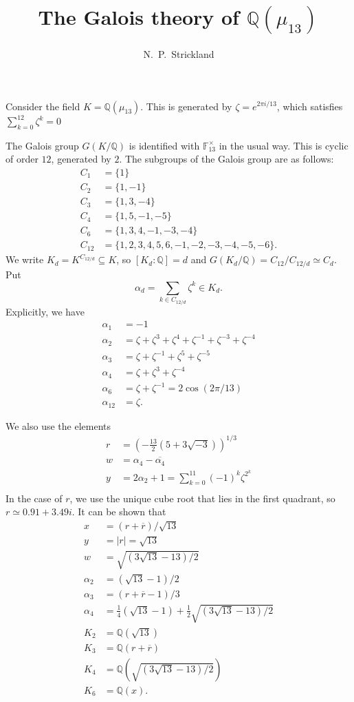 \documentclass{amsart}
\newcommand{\F}         {{\mathbb{F}}}
\newcommand{\Q}         {{\mathbb{Q}}}
\newcommand{\al}        {\alpha}
\newcommand{\ov}[1]     {\overline{#1}}
\newcommand{\sse}       {\subseteq}
\newcommand{\tm}        {\times}
\newcommand{\zt}        {\zeta}
\renewcommand{\:}{\colon}
\theoremstyle{definition}
\begin{document}
\title{The Galois theory of $\Q(\mu_{13})$}
\author{N.~P.~Strickland}

\maketitle 

Consider the field $K=\Q(\mu_{13})$.  This is generated by
$\zt=e^{2\pi i/13}$, which satisfies $\sum_{k=0}^{12}\zt^k=0$

The Galois group $G(K/\Q)$ is identified with $\F_{13}^\tm$ in the
usual way.  This is cyclic of order $12$, generated by $2$.  The
subgroups of the Galois group are as follows:
\begin{align*}
 C_1    &= \{1\} \\
 C_2    &= \{1,-1\} \\
 C_3    &= \{1,3,-4\} \\
 C_4    &= \{1,5,-1,-5\} \\
 C_6    &= \{1,3,4,-1,-3,-4\} \\
 C_{12} &= \{1,2,3,4,5,6,-1,-2,-3,-4,-5,-6\}.
\end{align*}
We write $K_d=K^{C_{12/d}}\sse K$, so $[K_d:\Q]=d$ and
$G(K_d/\Q)=C_{12}/C_{12/d}\simeq C_d$.  Put 
\[ \al_d = \sum_{k\in C_{12/d}} \zt^k \in K_d. \]
Explicitly, we have 
\begin{align*}
 \al_1 &= -1 \\
 \al_2 &= \zt + \zt^3 + \zt^4 + \zt^{-1} + \zt^{-3} + \zt^{-4} \\
 \al_3 &= \zt + \zt^{-1} + \zt^5 + \zt^{-5} \\
 \al_4 &= \zt + \zt^3 + \zt^{-4} \\
 \al_6 &= \zt + \zt^{-1} = 2\cos(2\pi/13) \\
 \al_{12} &= \zt.
\end{align*}

We also use the elements
\begin{align*}
 r &= \left(-\tfrac{13}{2}(5+3\sqrt{-3})\right)^{1/3} \\
 w &= \al_4 - \ov{\al_4} \\
 y &= 2\al_2 + 1 = \sum_{k=0}^{11} (-1)^k \zt^{2^k} \\
\end{align*}
In the case of $r$, we use the unique cube root that lies in the first
quadrant, so $r\simeq 0.91+3.49i$.  It can be shown that
\begin{align*}
 x &= (r+\ov{r})/\sqrt{13} \\
 y &= |r| = \sqrt{13} \\
 w &= \sqrt{(3\sqrt{13}-13)/2} \\
 \al_2 &= (\sqrt{13}-1)/2 \\
 \al_3 &= (r+\ov{r}-1)/3 \\
 \al_4 &= \tfrac{1}{4}(\sqrt{13}-1) +
          \tfrac{1}{2}\sqrt{(3\sqrt{13}-13)/2} \\
 K_2 &= \Q(\sqrt{13}) \\
 K_3 &= \Q(r+\ov{r}) \\
 K_4 &= \Q(\sqrt{(3\sqrt{13}-13)/2}) \\
 K_6 &= \Q(x).
\end{align*}
\end{document}
